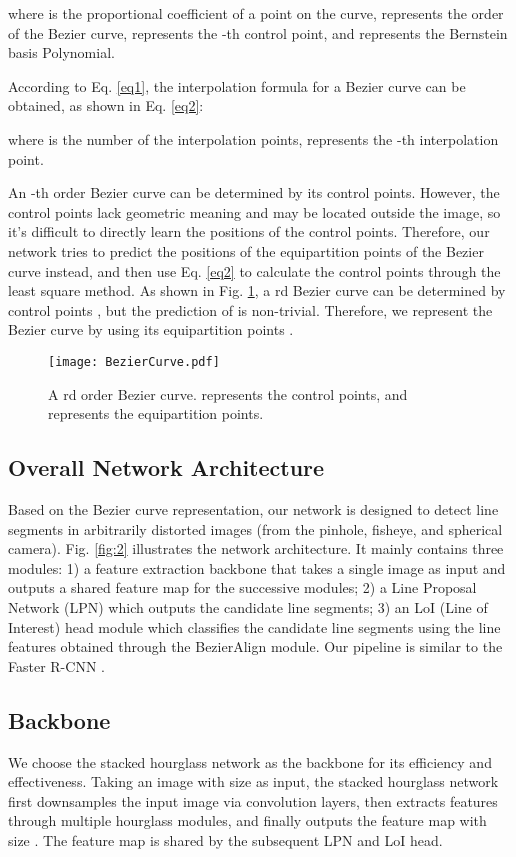 \documentclass[letterpaper, 10 pt, conference]{ieeeconf}
\begin{document}
where  is the proportional coefficient of a point on the curve,  represents the order of the Bezier curve,  represents the -th control point, and  represents the Bernstein basis Polynomial.

According to Eq. \ref{eq1}, the interpolation formula for a Bezier curve can be obtained, as shown in Eq. \ref{eq2}:

where  is the number of the interpolation points,  represents the -th interpolation point.

An -th order Bezier curve can be determined by its  control points. However, the control points lack geometric meaning and may be located outside the image, so it's difficult to directly learn the positions of the control points. Therefore, our network tries to predict the positions of the equipartition points of the Bezier curve instead, and then use Eq. \ref{eq2} to calculate the control points through the least square method. As shown in Fig. \ref{fig:3}, a rd Bezier curve can be determined by  control points , but the prediction of  is non-trivial. Therefore, we represent the Bezier curve by using its  equipartition points .
\begin{figure}[h]
	\begin{center}
		\texttt{[image: BezierCurve.pdf]}
	\end{center}
	\caption{A rd order Bezier curve.  represents the control points, and  represents the equipartition points.}
	\label{fig:3}
\end{figure} 

\subsection{Overall Network Architecture} \label{sec3-2}
Based on the Bezier curve representation, our network is designed to detect line segments in arbitrarily distorted images (from the pinhole, fisheye, and spherical camera). Fig. \ref{fig:2} illustrates the network architecture. It mainly contains three modules: 1) a feature extraction backbone that takes a single image as input and outputs a shared feature map for the successive modules; 2) a Line Proposal Network (LPN) which outputs the candidate line segments; 3) an LoI (Line of Interest) head module which classifies the candidate line segments using the line features obtained through the BezierAlign module. Our pipeline is similar to the Faster R-CNN \cite{FasterRCNN}.

\subsection{Backbone} \label{sec3-3}
We choose the stacked hourglass network \cite{SHN} as the backbone for its efficiency and effectiveness. Taking an image with size  as input, the stacked hourglass network first downsamples the input image via convolution layers, then extracts features through multiple hourglass modules, and finally outputs the feature map with size . The feature map is shared by the subsequent LPN and LoI head.
\end{document}

